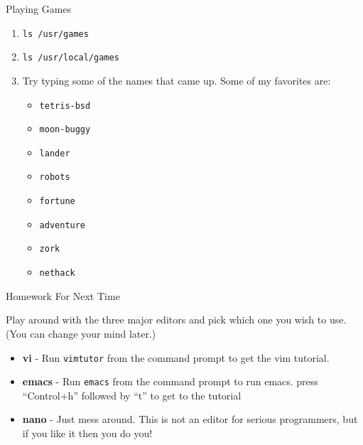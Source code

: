 \documentclass{beamer}
\begin{document}
\begin{frame}{Playing Games}
    \begin{enumerate}[<+->]
       \item {\tt ls /usr/games}
       \item {\tt ls /usr/local/games}
       \item Try typing some of the names that came up.  Some of my
       favorites are:
       \begin{itemize}
         \item {\tt tetris-bsd}
         \item {\tt moon-buggy}
         \item {\tt lander}
         \item {\tt robots}
         \item {\tt fortune}
         \item {\tt adventure}
         \item {\tt zork}
         \item {\tt nethack}
       \end{itemize}
    \end{enumerate}
\end{frame}

\begin{frame}{Homework For Next Time}
    
    Play around with the three major editors and pick which one you
    wish to use. (You can change your mind later.)

    \begin{itemize}
        \item {\bf vi} - Run {\tt vimtutor} from the command prompt to
        get the vim tutorial.
        \item {\bf emacs} - Run {\tt emacs} from the command prompt to
        run emacs.
        \newline press ``Control+h'' followed by ``t'' to get to the
        tutorial
        \item {\bf nano} - Just mess around.  This is not an editor
        for serious programmers, but if you like it then you do you!
    \end{itemize}
\end{frame}
\end{document}
